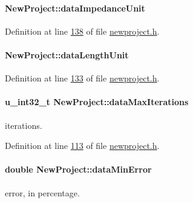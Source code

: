 \hypertarget{class_new_project_ae50ce899e9b67db0001a11044730a778}{}
\paragraph[{data\+Impedance\+Unit}]{ New\+Project\+::data\+Impedance\+Unit}\label{class_new_project_ae50ce899e9b67db0001a11044730a778}


Definition at line \hyperlink{newproject_8h_source_l00138}{138} of file \hyperlink{newproject_8h_source}{newproject.\+h}.

\hypertarget{class_new_project_ac0bf8b4f04f5c9425c74dd980711f021}{}
\paragraph[{data\+Length\+Unit}]{ New\+Project\+::data\+Length\+Unit}\label{class_new_project_ac0bf8b4f04f5c9425c74dd980711f021}


Definition at line \hyperlink{newproject_8h_source_l00133}{133} of file \hyperlink{newproject_8h_source}{newproject.\+h}.

\hypertarget{class_new_project_a189825d570bc9bc35c61f7fe40de986a}{}
\paragraph[{data\+Max\+Iterations}]{\setlength{\rightskip}{0pt plus 5cm}u\+\_\+int32\+\_\+t New\+Project\+::data\+Max\+Iterations}\label{class_new_project_a189825d570bc9bc35c61f7fe40de986a}
iterations. 

Definition at line \hyperlink{newproject_8h_source_l00113}{113} of file \hyperlink{newproject_8h_source}{newproject.\+h}.

\hypertarget{class_new_project_a186c2163239625faf8c7769a72fa988c}{}
\paragraph[{data\+Min\+Error}]{\setlength{\rightskip}{0pt plus 5cm}double New\+Project\+::data\+Min\+Error}\label{class_new_project_a186c2163239625faf8c7769a72fa988c}
error, in percentage. 

